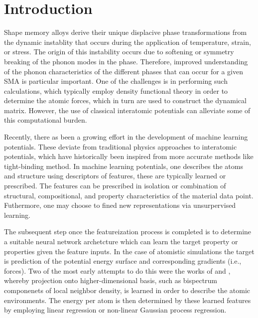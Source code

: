 \documentclass[preprint]{elsarticle}
\begin{document}
\section{Introduction}
\label{sec:intro}
Shape memory alloys derive their unique displacive phase transformations from the dynamic instablity that occurs during the application of temperature, strain, or stress. The origin of this instability occurs due to softening or symmetry breaking of the phonon modes in the phase. Therefore, improved understanding of the phonon characteristics of the different phases that can occur for a given SMA is particular important. One of the challenges is in performing such calculations, which typically employ density functional theory in order to determine the atomic forces, which in turn are used to construct the dynamical matrix. However, the use of classical interatomic potentials can alleviate some of this computational burden. \par

Recently, there as been a growing effort in the development of machine learning potentials. These deviate from traditional physics approaches to interatomic potentials, which have historically been inspired from more accurate methods like tight-binding method. In machine learning potentials, one describes the atoms and structure using descriptors of features, these are typically learned or prescribed. The features can be prescribed in isolation or combination of  structural, compositional, and property characteristics of the material data point. Futhermore, one may choose to fined new representations via unsurpervised learning. \par

The subsequent step once the featureization process is completed is to determine a suitable neural network archetcture which can learn the target property or properties given the feature inputs. In the case of atomistic simulations the target is prediction of the potential energy surface and corresponding gradients (i.e., forces). Two of the most early attempts to do this were the works of \citeauthor{Bartok2010} and \citeauthor{Thompson2015}, whereby projection onto higher-dimensional basis, such as bispectrum componenets of local neighbor density, is learned in order to describe the atomic environments. The energy per atom is then determined by these learned features by employing linear regression or non-linear Gaussian process regression. \par
\end{document}
